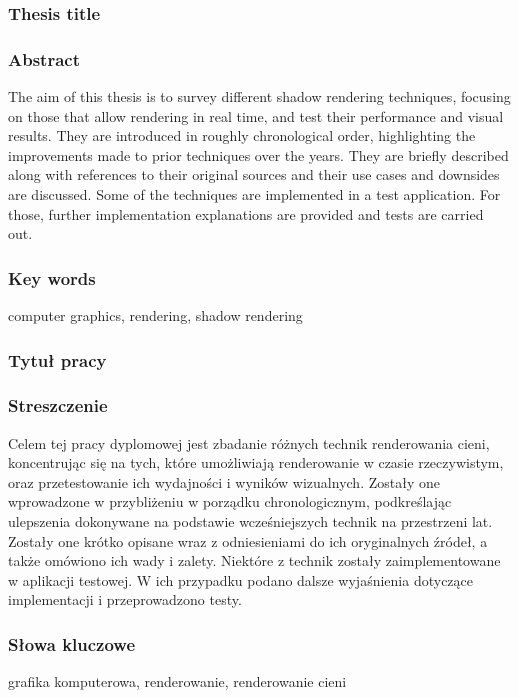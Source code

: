 \subsubsection*{Thesis title}
\Title

\subsubsection*{Abstract}
The aim of this thesis is to survey different shadow rendering techniques, focusing on those that allow rendering in real time, and test their performance and visual results. They are introduced in roughly chronological order, highlighting the improvements made to prior techniques over the years. They are briefly described along with references to their original sources and their use cases and downsides are discussed. Some of the techniques are implemented in a test application. For those, further implementation explanations are provided and tests are carried out.

\subsubsection*{Key words}
computer graphics, rendering, shadow rendering

\subsubsection*{Tytuł pracy}
\begin{otherlanguage}{polish}
\TitleAlt
\end{otherlanguage}

\subsubsection*{Streszczenie}
\begin{otherlanguage}{polish}
Celem tej pracy dyplomowej jest zbadanie różnych technik renderowania cieni, koncentrując się na tych, które umożliwiają renderowanie w czasie rzeczywistym, oraz przetestowanie ich wydajności i wyników wizualnych. Zostały one wprowadzone w przybliżeniu w porządku chronologicznym, podkreślając ulepszenia dokonywane na podstawie wcześniejszych technik na przestrzeni lat. Zostały one krótko opisane wraz z odniesieniami do ich oryginalnych źródeł, a także omówiono ich wady i zalety. Niektóre z technik zostały zaimplementowane w aplikacji testowej. W ich przypadku podano dalsze wyjaśnienia dotyczące implementacji i przeprowadzono testy.
\end{otherlanguage}

\subsubsection*{Słowa kluczowe}
\begin{otherlanguage}{polish}
grafika komputerowa, renderowanie, renderowanie cieni
\end{otherlanguage}
